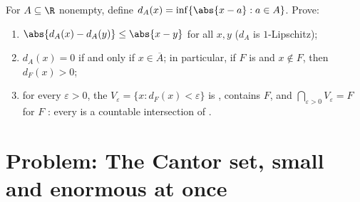 \begin{exercise}[$\star\star\star$]\label{exo:b1:topology:12}
For $A \subseteq \R$ nonempty, define $d_A(x) = \inf\{\abs{x - a}
: a \in A\}$. Prove:
\begin{enumerate}
  \item $\abs{d_A(x) - d_A(y)} \leq \abs{x - y}$ for all $x, y$
        ($d_A$ is $1$-Lipschitz);
  \item $d_A(x) = 0$ if and only if $x \in \overline A$; in
        particular, if $F$ is  and $x \notin F$, then
        $d_F(x) > 0$;
  \item for every $\varepsilon > 0$, the  $V_\varepsilon =
        \{x : d_F(x) < \varepsilon\}$ is , contains $F$, and
        $\bigcap_{\varepsilon > 0} V_\varepsilon = F$ for $F$
        : every  is a countable intersection of
        .
\end{enumerate}
\end{exercise}

\section{Problem: The Cantor set, small and enormous at once}

